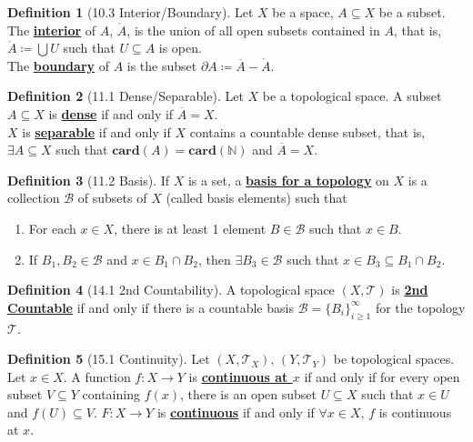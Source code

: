 \documentclass{article}
\newcommand{\N}{\ensuremath{\mathbb{N}}}
\newcommand{\B}{\ensuremath{\mathcal{B}}}
\newcommand{\Iff}{if and only if}
\newcommand{\ts}{topological space}
\newcommand{\coleq}{\ensuremath{\coloneqq}}
\newcommand{\define}[1]{\textbf{\underline{#1}}}
\newcommand{\card}[1]{\ensuremath{\mathbf{card} (#1)}}
\newcommand{\func}[3]{\ensuremath{#1: #2 \to #3}}
\newcommand{\closure}[1]{\ensuremath{\overline{#1}}}
\newcommand{\tp}{\ensuremath{\mathscr{T}}}
\newcommand{\Ts}[2]{\ensuremath{(#1,#2)}}
\newcommand{\Union}{\bigcup}
\newcommand{\inter}{\cap}
\newcommand{\interior}[1]{\ensuremath{\mathring{#1}}}
\newcommand{\bound}[1]{\ensuremath{\partial #1}}
\renewcommand{\Subset}{\subseteq}
\theoremstyle{definition}
\newtheorem*{defn}{Definition}
\theoremstyle{remark}
\begin{document}
{        \begin{defn}[10.3 Interior/Boundary]
            Let $X$ be a space, $A \Subset X$ be a subset. The \define{interior} of $A$, $\interior{A}$, is the union of all open subsets contained in $A$, that is,  $\interior{A}\coleq \Union U$ such that $U \Subset A$ is open.\\
            The \define{boundary} of $A$ is the subset $\bound{A} \coleq \closure{A}-\interior{A}$.
        \end{defn}
        
        \begin{defn}[11.1 Dense/Separable]
            Let $X$ be a \ts{}. A subset $A \Subset X$ is \define{dense} \Iff{} $\closure{A}=X$.\\
            $X$ is \define{separable} \Iff{} $X$ contains a countable dense subset, that is, $\exists A \Subset X$ such that $\card{A}=\card{\N}$ and $\closure{A} = X$.
        \end{defn}
        
        \begin{defn}[11.2 Basis]
            If $X$ is a set, a \define{basis for a topology} on $X$ is a collection $\B$ of subsets of $X$ (called basis elements) such that
            \begin{enumerate}
                \item For each $x \in X$, there is at least 1 element $B \in \B$ such that $x \in B$.
                \item If $B_1,B_2 \in \B$ and $x \in B_1\inter B_2$, then $\exists B_3 \in \B$ such that $x \in B_3 \Subset B_1 \inter B_2$.
            \end{enumerate}
        \end{defn}
        
        \begin{defn}[14.1 2nd Countability]
            A \ts{} $\Ts{X}{\tp}$ is \define{2nd Countable} \Iff{} there is a countable basis $\B =\{B_i\}_{i\geq1}^\infty$ for the topology $\tp$.
        \end{defn}
        
        \begin{defn}[15.1 Continuity]
            Let $\Ts{X}{\tp_X}, \, \Ts{Y}{\tp_Y}$ be topological spaces. Let $x \in X$. A function $\func{f}{X}{Y}$ is \define{continuous at $x$} \Iff{} for every open subset $V \Subset Y$ containing $f(x)$, there is an open subset $U \Subset X$ such that $x\in U$ and $f(U) \Subset V$. $\func{F}{X}{Y}$ is \define{continuous} \Iff{} $\forall x \in X$, $f$ is continuous at $x$.
        \end{defn}
        
}
\end{document}
